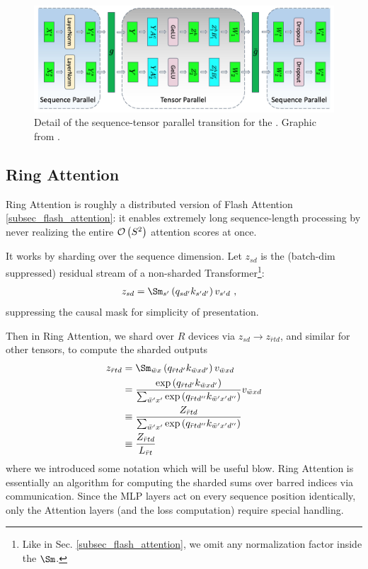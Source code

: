 \begin{figure}[ht]
	\centering
	\includegraphics[scale=.25]{figures/mlp-tensor-sequence-parallel.jpg}
	\caption{Detail of the sequence-tensor parallel transition for the  . Graphic from
		\cite{shoeybi2020megatronlm}. }
	\label{fig_tensor_seq_parallel_detail}
\end{figure}


\subsection{Ring Attention \label{subsec_ring_attention}}

Ring Attention \cite{liu2023ringattentionblockwisetransformers} is roughly a distributed version of
Flash Attention \ref{subsec_flash_attention}: it enables extremely long sequence-length processing
by never realizing the entire $ \mathcal{O} \left( S ^{ 2 } \right)  $ attention scores at once.

It works by sharding over the sequence dimension. Let $ z _{ sd } $ is the (batch-dim suppressed)
residual stream of a non-sharded Transformer\footnote{Like in Sec. \ref{subsec_flash_attention}, we
omit any normalization factor inside the $ \Sm $.}:
\begin{align}
    z _{  sd } &= \Sm _{ s' } \left ( q _{ sd' } k _{ s'd' } \right ) v _{ s'd } \ ,
\end{align}
suppressing the causal mask for simplicity of presentation.

Then in Ring Attention, we shard over $ R $ devices via $ z _{ sd } \longrightarrow z _{ \bar{r}td }
$, and similar for other tensors, to compute the sharded outputs
\begin{align}
    z _{  \bar{r}td } &= \Sm _{ \bar{w} x  } \left ( q _{ \bar{r}t d' } k _{ \bar{w}x d' } \right ) v _{ \bar{w}x d }\nn
     &= \frac{ \exp \left ( q _{ \bar{r}t d' } k _{ \bar{w}x d' } \right ) }{ \sum _{ \bar{w}'x' } \exp \left (q _{ \bar{r}t d'' } k _{ \bar{w}'x' d'' }\right )  } v _{ \bar{w}xd }\nn
     &\equiv \frac{ Z _{\bar{r}td } }{   \sum _{ \bar{w}'x' } \exp  \left (q _{ \bar{r}t d'' } k _{ \bar{w}'x' d'' } \right ) }\nn
     &\equiv \frac{ Z _{\bar{r}td } }{L _{ \bar{r}t }}
\end{align}
where we introduced some notation which will be useful blow. Ring Attention is essentially an
algorithm for computing the sharded sums over barred indices via communication. Since the MLP layers
act on every sequence position identically, only the Attention layers (and the loss computation)
require special handling.

